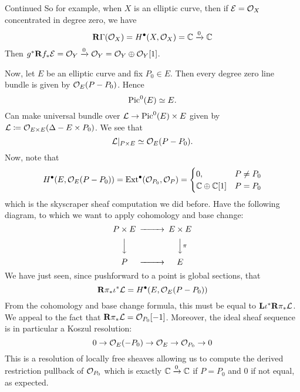 \begin{example}{Continued}{}
    So for example, when $X$ is an elliptic curve, then if $\mathcal{E}=\mathcal{O}_X$ concentrated in degree zero, we have
\begin{equation*}
    \operatorname{\mathbf{R}\Gamma}(\mathcal{O}_X)=H^\bullet(X,\mathcal{O}_X) = \mathbb{C}\xrightarrow{0}\mathbb{C}
\end{equation*}
Then $g^*\mathbf{R} f_*\mathcal{E} = \mathcal{O}_Y\xrightarrow{0}\mathcal{O}_Y = \mathcal{O}_Y\oplus\mathcal{O}_Y[1]$.

Now, let $E$ be an elliptic curve and fix $P_0\in E$. Then every degree zero line bundle is given by $\mathcal{O}_E(P-P_0)$. Hence
\begin{equation*}
    \operatorname{Pic}^0(E)\simeq E.
\end{equation*}
Can make universal bundle over $\mathcal{L}\to\operatorname{Pic}^0(E)\times E$ given by $\mathcal{L}\coloneqq\mathcal{O}_{E\times E}(\Delta-E\times P_0)$. We see that
\begin{equation*}
    \mathcal{L}|_{P\times E}\simeq \mathcal{O}_E(P-P_0).
\end{equation*}
Now, note that
\begin{equation*}
    H^\bullet(E,\mathcal{O}_E(P-P_0))
        = \operatorname{Ext}^\bullet(\mathcal{O}_{P_0},\mathcal{O}_P)
        = \begin{cases}
            0, & P\neq P_{0} \\
            \mathbb{C}\oplus\mathbb{C}[1] & P=P_{0}
        \end{cases}
\end{equation*}
which is the skyscraper sheaf computation we did before.
Have the following diagram, to which we want to apply cohomology and base change:
\begin{equation*}
    \begin{CD}
        P\times E @>>> E\times E \\
          @VVV @VV\pi V \\
        P @>>> E
    \end{CD}
\end{equation*}
We have just seen, since pushforward to a point is global sections, that
\begin{equation*}
    \mathbf{R}\pi_*\iota^*\mathcal{L} = H^\bullet(E,\mathcal{O}_E(P-P_0))
\end{equation*}
From the cohomology and base change formula, this must be equal to $\mathbf{L}\iota^*\mathbf{R}\pi_*\mathcal{L}$. We appeal to the fact that $\mathbf{R}\pi_*\mathcal{L}=\mathcal{O}_{P_0}[-1]$. Moreover, the ideal sheaf sequence is in particular a Koszul resolution:
\begin{equation*}
    0\to\mathcal{O}_E(-P_0)\to\mathcal{O}_E\to\mathcal{O}_{P_0}\to 0
\end{equation*}
This is a resolution of locally free sheaves allowing us to compute the derived restriction pullback of $\mathcal{O}_{P_0}$ which is exactly $\mathbb{C}\xrightarrow{0}\mathbb{C}$ if $P=P_0$ and $0$ if not equal, as expected.


\end{example}

